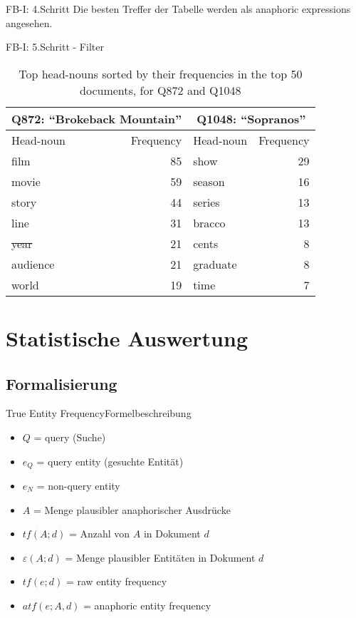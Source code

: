 \documentclass{beamer}
\begin{document}
\begin{frame}{FB-I: 4.Schritt}
	Die besten Treffer der Tabelle werden als anaphoric expressions angesehen.
\end{frame}


\begin{frame}{FB-I: 5.Schritt - Filter}
	\begin{table}
		\centering
		\begin{tabular}{lrlr}
			\toprule
			\multicolumn{2}{c}{\textbf{Q872:} ``Brokeback Mountain''} & \multicolumn{2}{c}{\textbf{Q1048:} ``Sopranos''} \\
			\midrule
			Head-noun & Frequency & Head-noun & Frequency \\
			film	& 85	& show & 29 \\
			movie & 59 & season & 16 \\
			story & 44 & series & 13 \\
			line & 31 & bracco & 13 \\
			\sout{year} & 21 & cents & 8 \\
			audience & 21 & graduate & 8 \\
			world & 19 & time & 7\\
			\bottomrule
		\end{tabular}
		\caption{Top head-nouns sorted by their frequencies in the top 50 documents, for Q872 and Q1048}
		\cite{paper:NaNg}
	\end{table}
\end{frame}


\section{Statistische Auswertung}

\subsection{Formalisierung}

\begin{frame}{True Entity Frequency}{Formelbeschreibung}

  \begin{itemize}
	\item $Q$ = query (Suche)
	\item $e_Q$ = query entity (gesuchte Entität)
	\item $e_N$ = non-query entity
	\item $A$ = Menge plausibler anaphorischer Ausdrücke
	\item $tf(A;d)$ = Anzahl von $A$ in Dokument $d$
	\item $\varepsilon (A;d)$ = Menge plausibler Entitäten in Dokument $d$
	\item $tf(e;d)$ = raw entity frequency
	\item $atf(e;A,d)$ = anaphoric entity frequency
  \end{itemize}
\end{frame}
\end{document}
